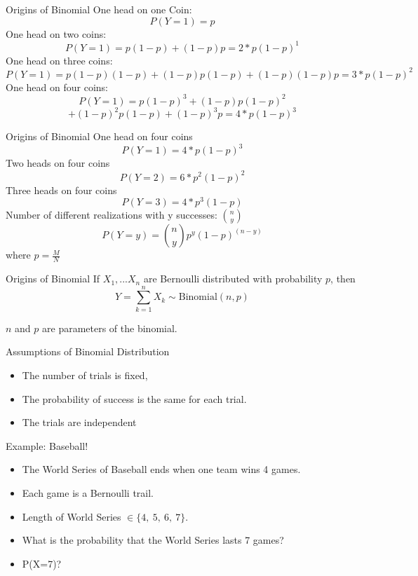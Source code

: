 \documentclass{beamer}
\numberwithin{equation}{section}
\begin{document}
\begin{frame}{Origins of Binomial}
One head on one Coin:
$$P(Y=1)=p$$
One head on two coins:\pause
$$P(Y=1)=p(1-p)+(1-p)p=2*p(1-p)^{1}$$
One head on three coins:\pause
$$P(Y=1)=p(1-p)(1-p)+(1-p)p(1-p)+(1-p)(1-p)p=3*p(1-p)^{2}$$
One head on four coins:\pause
$$P(Y=1)=p(1-p)^3+(1-p)p(1-p)^2$$
$$+(1-p)^2p(1-p)+(1-p)^3p=4*p(1-p)^{3}$$

\end{frame}

\begin{frame}{Origins of Binomial}
One head on four coins
$$P(Y=1)=4*p(1-p)^{3}$$
Two heads on four coins\pause
$$P(Y=2)= 6*p^2(1-p)^{2}$$
Three heads on four coins\pause
$$P(Y=3)=4*p^3(1-p)$$
Number of different realizations with y successes: ${n \choose y}$
$$P(Y=y)={n\choose y} p^y(1-p)^{(n-y)}$$
where $p=\frac{M}{N}$

\end{frame}


\begin{frame}{Origins of Binomial}
If $X_1, ... X_n$ are Bernoulli distributed with probability $p$, then
$$Y=\sum_{k=1}^nX_k \sim \text{Binomial}(n, p)$$

$n$ and $p$ are parameters of the binomial.
\end{frame}



\begin{frame}{Assumptions of Binomial Distribution}
\begin{itemize}
\item The number of trials is fixed,
\item The probability of success is the same for each trial.
\item The trials are independent
\end{itemize}
\end{frame}

\begin{frame}{Example: Baseball!}
\begin{itemize}
\item The World Series of Baseball ends when one team wins 4 games.
\item Each game is a Bernoulli trail.\pause
\item Length of World Series $\in\{4,\ 5,\ 6,\ 7\}$.
\item What is the probability that the World Series lasts 7 games? \pause
\item P(X=7)?
\end{itemize}
\end{frame}
\end{document}
